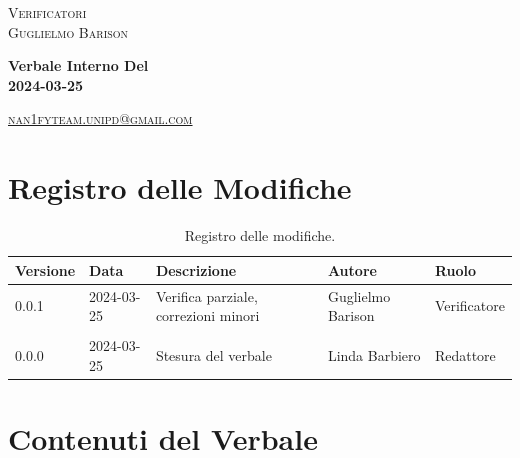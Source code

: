 \documentclass[8pt]{article}
\begin{document}
\begin{titlepage}
\begin{minipage}[t]{0.47\textwidth}
		{\large{\textsc{Verificatori}}
			\vspace{3mm}
			{\\\large{\textsc{Guglielmo Barison}\\}} %
			{\large{\textsc{   }}}
			
		}
		\vspace{4mm}\vspace{4mm}
	\end{minipage}
	\vspace{4cm}
	\begin{center}
		\begin{flushright}
			{\fontsize{30pt}{52pt}\selectfont \textbf{Verbale Interno Del\\2024-03-25\\}} %
		\end{flushright}
		\vspace{3cm}
	\end{center}
	\vspace{8.5 cm}
	{\small \textsc{\href{mailto: nan1fyteam.unipd@gmail.com}{nan1fyteam.unipd@gmail.com}}}
\end{titlepage}
\pagestyle{mystyle}
\section*{Registro delle Modifiche}
\begin{table}[ht!]	
	\centering
	\begin{tabular}{p{1.2cm} p{2cm} p{6cm} p{3cm} p{2cm}}
		\toprule
		\textbf{Versione}& \textbf{Data} & \textbf{Descrizione} & \textbf{Autore} & \textbf{Ruolo} \\
		\midrule
		0.0.1 & 2024-03-25 & Verifica parziale, correzioni minori & Guglielmo Barison & Verificatore \\
		\\ %
		0.0.0 & 2024-03-25 & Stesura del verbale & Linda Barbiero & Redattore \\
		\bottomrule
	\end{tabular}
	\caption{Registro delle modifiche.}
	\label{table:Registro delle modifiche}
\end{table}
\newpage
\tableofcontents
\clearpage
\newpage
\justifying
\section{Contenuti del Verbale}
\end{document}
